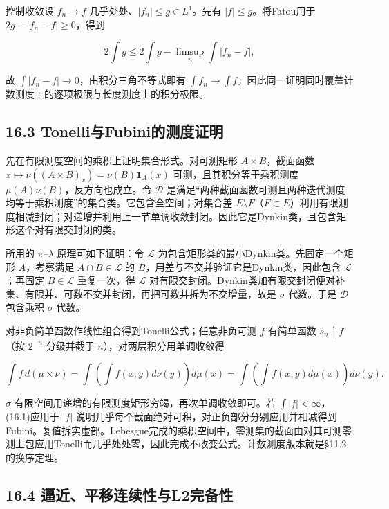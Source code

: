 \documentclass[11pt,a4paper]{article}
\begin{document}
控制收敛设 \(f_n\to f\) 几乎处处、\(|f_n|\le g\in L^1\)。先有
\(|f|\le g\)。将Fatou用于 \(2g-|f_n-f|\ge0\)，得到

\[
2\int g\le2\int g-\limsup_n\int|f_n-f|,
\]

故 \(\int|f_n-f|\to0\)，由积分三角不等式即有
\(\int f_n\to\int f\)。因此同一证明同时覆盖计数测度上的逐项极限与长度测度上的积分极限。

\subsection{16.3
Tonelli与Fubini的测度证明}\label{tonelliux4e0efubiniux7684ux6d4bux5ea6ux8bc1ux660e}

先在有限测度空间的乘积上证明集合形式。对可测矩形 \(A\times B\)，截面函数
\(x\mapsto\nu((A\times B)_x)=\nu(B)\mathbf1_A(x)\)
可测，且其积分等于乘积测度 \(\mu(A)\nu(B)\)，反方向也成立。令
\(\mathcal D\)
是满足``两种截面函数可测且两种迭代测度均等于乘积测度''的集合类。它包含全空间；对集合差
\(E\setminus F\)（\(F\subset E\)）利用有限测度相减封闭；对递增并利用上一节单调收敛封闭。因此它是Dynkin类，且包含矩形这个对有限交封闭的类。

所用的 \(\pi\)--\(\lambda\) 原理可如下证明：令 \(\mathcal L\)
为包含矩形类的最小Dynkin类。先固定一个矩形 \(A\)，考察满足
\(A\cap B\in\mathcal L\) 的
\(B\)，用差与不交并验证它是Dynkin类，因此包含 \(\mathcal L\)；再固定
\(B\in\mathcal L\) 重复一次，得 \(\mathcal L\)
对有限交封闭。Dynkin类加有限交封闭便对补集、有限并、可数不交并封闭，再把可数并拆为不交增量，故是
\(\sigma\) 代数。于是 \(\mathcal D\) 包含乘积 \(\sigma\) 代数。

对非负简单函数作线性组合得到Tonelli公式；任意非负可测 \(f\) 有简单函数
\(s_n\uparrow f\)（按 \(2^{-n}\) 分级并截于
\(n\)），对两层积分用单调收敛得

\[
\int f\,d(\mu\times\nu)
=\int\left(\int f(x,y)d\nu(y)\right)d\mu(x)
=\int\left(\int f(x,y)d\mu(x)\right)d\nu(y).\tag{16.1}
\]

\(\sigma\) 有限空间用递增的有限测度矩形穷竭，再次单调收敛即可。若
\(\int|f|<\infty\)，(16.1)应用于 \(|f|\)
说明几乎每个截面绝对可积，对正负部分分别应用并相减得到Fubini。复值拆实虚部。Lebesgue完成的乘积空间中，零测集的截面由对其可测零测上包应用Tonelli而几乎处处零，因此完成不改变公式。计数测度版本就是§11.2的换序定理。

\subsection{16.4
逼近、平移连续性与L2完备性}\label{ux903cux8fd1ux5e73ux79fbux8fdeux7eedux6027ux4e0el2ux5b8cux5907ux6027}
\end{document}
